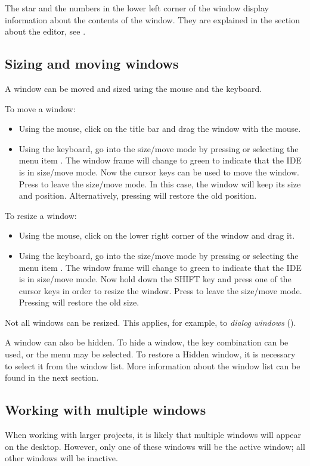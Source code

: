 The star and the numbers in the lower left corner of the window
display information about the contents of the window. They
are explained in the section about the editor, see .

%
%
\subsection{Sizing and moving windows}
\label{se:windowsizingmoving}
A window can be moved and sized using the mouse and the keyboard.

To move a window:
\begin{itemize}
\item Using the mouse, click on the title bar and drag the window
with the mouse.
\item Using the keyboard, go into the size/move mode
by pressing  or selecting the menu item
. The window  frame will change to green to 
indicate that the IDE is in  size/move mode. Now the cursor keys 
can be used to move the  window. Press  to leave the 
size/move mode. In this case, the window will keep its size and 
position. Alternatively, pressing  will restore the old 
position.
\end{itemize}
To resize a window:
\begin{itemize}
\item Using the mouse, click on the lower right corner of the window
and drag it.
\item Using the keyboard, go into the size/move mode by pressing  or selecting the menu item
. The window frame will change to green to 
indicate that the IDE is in size/move mode. Now hold down the SHIFT 
key and press one of the cursor keys in order to resize the window. 
Press  to leave the size/move mode.
Pressing  will restore the old size.
\end{itemize}
Not all windows can be resized. This applies, for example, to
\emph{dialog windows} ().

A window can also be hidden. To hide a window, the  key
combination can be used, or the  menu may be selected.
To restore a Hidden window, it is necessary to select it from the window
list. More information about the window list can be found in the next
section.
%
%
\subsection{Working with multiple windows}
\label{se:multiplewindows}
When working with larger projects, it is likely that multiple windows
will appear on the desktop. However, only one of these windows will be
the active window; all other windows will be inactive.

